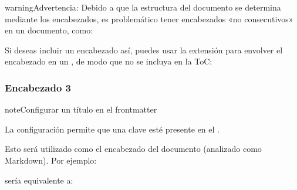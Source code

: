 \documentclass[a4paper,10pt,oneside,spanish,openany]{sphinxmanual}
\begin{document}
\begin{sphinxadmonition}{warning}{Advertencia:}
\sphinxAtStartPar
Debido a que la estructura del documento se determina mediante los encabezados, es problemático tener encabezados «no consecutivos» en un documento, como:

\begin{sphinxVerbatim}[commandchars=\\\{\}]
\end{sphinxVerbatim}

\sphinxAtStartPar
Si deseas incluir un encabezado así, puedes usar la extensión {\hyperref[\detokenize{configuracion_inicial/013.guia_de_myst_parser:syntax/attributes/block}]{}} para envolver el encabezado en un , de modo que no se incluya en la ToC:

\begin{sphinxVerbatim}[commandchars=\\\{\}]
\end{sphinxVerbatim}
\subsubsection*{Encabezado 3}

\begin{sphinxVerbatim}[commandchars=\\\{\}]

\end{sphinxVerbatim}
\end{sphinxadmonition}

\begin{sphinxadmonition}{note}{Configurar un título en el front\sphinxhyphen{}matter}

\sphinxAtStartPar
{}

\sphinxAtStartPar
La configuración  permite que una clave  esté presente en el {\hyperref[\detokenize{configuracion_inicial/013.guia_de_myst_parser:syntax/frontmatter}]{}}.

\sphinxAtStartPar
Esto será utilizado como el encabezado del documento (analizado como Markdown). Por ejemplo:

\begin{sphinxVerbatim}[commandchars=\\\{\}]
\PYGZhy{}\PYGZhy{}\PYGZhy{}
\end{sphinxVerbatim}

\sphinxAtStartPar
sería equivalente a:

\begin{sphinxVerbatim}[commandchars=\\\{\}]
\end{sphinxVerbatim}
\end{sphinxadmonition}
\end{document}
